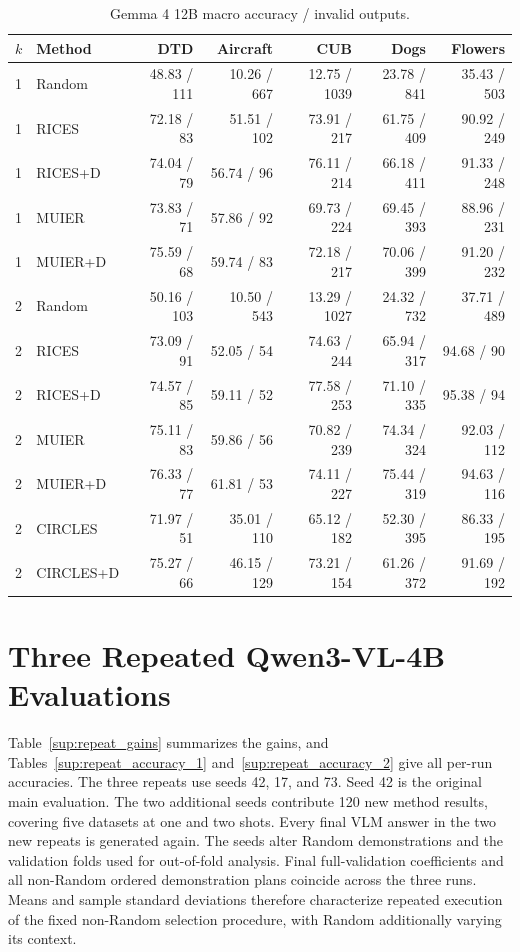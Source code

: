 \documentclass[10pt,twocolumn,letterpaper]{article}
\begin{document}
\begin{table}[t]
\caption{Gemma 4 12B macro accuracy / invalid outputs.}
\label{sup:macro_invalid_2}
\centering\small
\begin{tabular}{llrrrrr}
\toprule
$k$ & Method & DTD & Aircraft & CUB & Dogs & Flowers \\
\midrule
1 & Random & 48.83 / 111 & 10.26 / 667 & 12.75 / 1039 & 23.78 / 841 & 35.43 / 503 \\
1 & RICES & 72.18 / 83 & 51.51 / 102 & 73.91 / 217 & 61.75 / 409 & 90.92 / 249 \\
1 & RICES+D & 74.04 / 79 & 56.74 / 96 & 76.11 / 214 & 66.18 / 411 & 91.33 / 248 \\
1 & MUIER & 73.83 / 71 & 57.86 / 92 & 69.73 / 224 & 69.45 / 393 & 88.96 / 231 \\
1 & MUIER+D & 75.59 / 68 & 59.74 / 83 & 72.18 / 217 & 70.06 / 399 & 91.20 / 232 \\
2 & Random & 50.16 / 103 & 10.50 / 543 & 13.29 / 1027 & 24.32 / 732 & 37.71 / 489 \\
2 & RICES & 73.09 / 91 & 52.05 / 54 & 74.63 / 244 & 65.94 / 317 & 94.68 / 90 \\
2 & RICES+D & 74.57 / 85 & 59.11 / 52 & 77.58 / 253 & 71.10 / 335 & 95.38 / 94 \\
2 & MUIER & 75.11 / 83 & 59.86 / 56 & 70.82 / 239 & 74.34 / 324 & 92.03 / 112 \\
2 & MUIER+D & 76.33 / 77 & 61.81 / 53 & 74.11 / 227 & 75.44 / 319 & 94.63 / 116 \\
2 & CIRCLES & 71.97 / 51 & 35.01 / 110 & 65.12 / 182 & 52.30 / 395 & 86.33 / 195 \\
2 & CIRCLES+D & 75.27 / 66 & 46.15 / 129 & 73.21 / 154 & 61.26 / 372 & 91.69 / 192 \\
\bottomrule
\end{tabular}
\end{table}

\section{Three Repeated Qwen3-VL-4B Evaluations}
\label{sup:repeated}
Table~\ref{sup:repeat_gains} summarizes the gains, and Tables~\ref{sup:repeat_accuracy_1} and~\ref{sup:repeat_accuracy_2} give all per-run accuracies. The three repeats use seeds 42, 17, and 73. Seed 42 is the original main evaluation. The two additional seeds contribute 120 new method results, covering five datasets at one and two shots. Every final VLM answer in the two new repeats is generated again. The seeds alter Random demonstrations and the validation folds used for out-of-fold analysis. Final full-validation coefficients and all non-Random ordered demonstration plans coincide across the three runs. Means and sample standard deviations therefore characterize repeated execution of the fixed non-Random selection procedure, with Random additionally varying its context.
\end{document}
